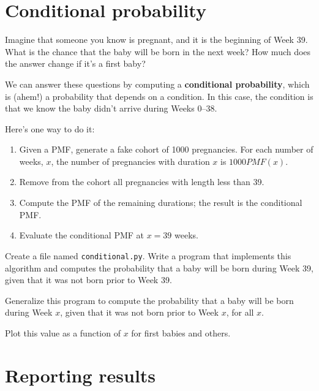 \documentclass[12pt]{book}
\begin{document}
\section{Conditional probability}

Imagine that someone you know is pregnant, and it is the beginning of
Week 39.  What is the chance that the baby will be born in the next
week?  How much does the answer change if it's a first baby?

We can answer these questions by computing a {\bf conditional
probability}, which is (ahem!) a probability that depends on a condition.
In this case, the condition is that we know the baby didn't arrive
during Weeks 0--38.

Here's one way to do it:

\begin{enumerate}

\item Given a PMF, generate a fake cohort of 1000 pregnancies.
For each number of weeks, $x$, the number of pregnancies with
duration $x$ is $1000 PMF(x)$.

\item Remove from the cohort all pregnancies with length less than 39.

\item Compute the PMF of the remaining durations; the result is the
conditional PMF.

\item Evaluate the conditional PMF at $x = 39$ weeks.

\end{enumerate}

\begin{ex}
Create a file named {\tt conditional.py}.
Write a program that implements this algorithm and computes the
probability that a baby will be born during Week 39, given that
it was not born prior to Week 39.

Generalize this program to compute the
probability that a baby will be born during Week $x$, given that
it was not born prior to Week $x$, for all $x$.

Plot this value as a function of $x$ for first babies and others.

\end{ex}


\section{Reporting results}
\end{document}
